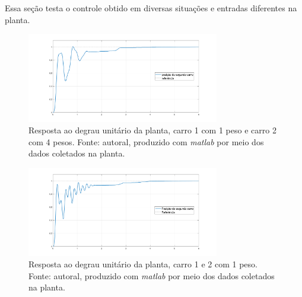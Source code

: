 \documentclass{ifacconf}
\begin{document}
Essa seção testa o controle obtido em diversas situações e entradas diferentes na planta.


\begin{figure}[!htb]
  \begin{center}
  \includegraphics[width=8.4cm]{figures/resultado_teste1.png}    %
  \caption{Resposta ao degrau unitário da planta, carro 1 com 1 peso e carro 2 com 4 pesos. Fonte: autoral, produzido com \textit{matlab} por meio dos dados coletados na planta.} 
  \label{fig:teste_step1_c1_1p_c2_4p}
  \end{center}
\end{figure}

\begin{figure}[!htb]
  \begin{center}
  \includegraphics[width=8.4cm]{figures/resultado_teste2.png}    %
  \caption{Resposta ao degrau unitário da planta, carro 1 e 2 com 1 peso. Fonte: autoral, produzido com \textit{matlab} por meio dos dados coletados na planta.} 
  \label{fig:teste_step1_c1_1p_c2_1p}
  \end{center}
\end{figure}
\end{document}
